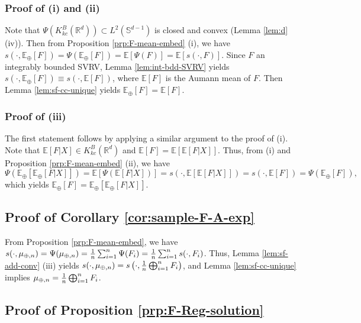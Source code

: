 \documentclass[11pt,reqno]{amsart}
\begin{document}
\subsubsection{Proof of (i) and (ii)}

Note that $\Psi(K_{kc}^B(\mathbb{R}^d)) \subset L^2(\mathbb{S}^{d-1})$ is closed and convex (Lemma \ref{lem:d} (iv)).  Then from Proposition \ref{prp:F-mean-embed} (i), we have $s(\cdot, \mathbb{E}_\oplus[F])=\Psi(\mathbb{E}_\oplus[F])=\mathbb{E}[\Psi(F)] = \mathbb{E}[s(\cdot, F)]$. Since $F$ an integrably bounded SVRV, Lemma \ref{lem:int-bdd-SVRV} yields $s(\cdot, \mathbb{E}_\oplus[F]) \equiv s(\cdot, \mathbb{E}[F])$, where $\mathbb{E}[F]$ is the Aumann mean of $F$. Then Lemma \ref{lem:sf-cc-unique} yields $\mathbb{E}_\oplus[F] = \mathbb{E}[F]$. 

\subsubsection{Proof of (iii)}

The first statement follows by applying a similar argument to the proof of (i). Note that $\mathbb{E}[F|X] \in K_{kc}^B(\mathbb{R}^d)$ and $\mathbb{E}[F] = \mathbb{E}[\mathbb{E}[F|X]]$. Thus, from (i) and  Proposition \ref{prp:F-mean-embed} (ii), we have
\[
\Psi(\mathbb{E}_\oplus[\mathbb{E}_\oplus[F|X]]) =\mathbb{E}[\Psi(\mathbb{E}[F|X])] = s(\cdot, \mathbb{E}[\mathbb{E}[F|X]]) = s(\cdot, \mathbb{E}[F]) =\Psi(\mathbb{E}_\oplus[F]),
\]
which yields $\mathbb{E}_\oplus[F] = \mathbb{E}_\oplus[\mathbb{E}_\oplus[F|X]]$.

\subsection{Proof of Corollary \ref{cor:sample-F-A-exp}}
From Proposition \ref{prp:F-mean-embed}, we have $s(\cdot, \mu_{\oplus,n})=\Psi(\mu_{\oplus,n})={1 \over n}\sum_{i=1}^n\Psi(F_i) = {1 \over n}  \sum_{i=1}^n s(\cdot, F_i)$. Thus, Lemma \ref{lem:sf-add-conv} (iii) yields $s(\cdot, \mu_{\oplus,n}) = s\left(\cdot,  {1 \over n} \bigoplus_{i=1}^n F_i \right)$, and Lemma \ref{lem:sf-cc-unique} implies $\mu_{\oplus,n} = {1 \over n}  \bigoplus_{i=1}^n  F_i$. 

\subsection{Proof of Proposition \ref{prp:F-Reg-solution}}
\end{document}
